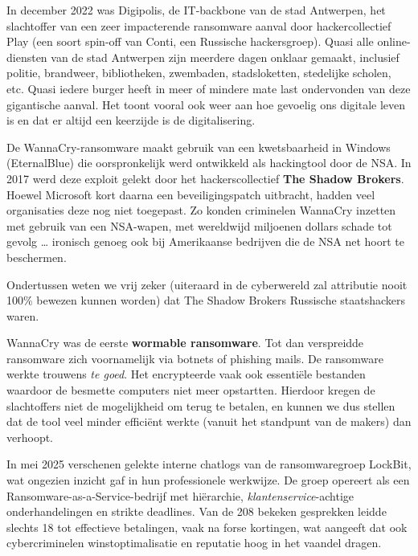 \documentclass[
  10pt,
  dutch,
  paper=a4,
  ,captions=tableheading
]{scrbook}
\begin{document}
\begin{noteblock}
In december 2022 was Digipolis, de IT-backbone van de stad Antwerpen,
het slachtoffer van een zeer impacterende ransomware aanval door
hackercollectief Play (een soort spin-off van Conti, een Russische
hackersgroep). Quasi alle online-diensten van de stad Antwerpen zijn
meerdere dagen onklaar gemaakt, inclusief politie, brandweer,
bibliotheken, zwembaden, stadsloketten, stedelijke scholen, etc. Quasi
iedere burger heeft in meer of mindere mate last ondervonden van deze
gigantische aanval. Het toont vooral ook weer aan hoe gevoelig ons
digitale leven is en dat er altijd een keerzijde is de digitalisering.
\end{noteblock}

De WannaCry-ransomware maakt gebruik van een kwetsbaarheid in Windows
(EternalBlue) die oorspronkelijk werd ontwikkeld als hackingtool door de
NSA. In 2017 werd deze exploit gelekt door het hackerscollectief
\textbf{The Shadow Brokers}. Hoewel Microsoft kort daarna een
beveiligingspatch uitbracht, hadden veel organisaties deze nog niet
toegepast. Zo konden criminelen WannaCry inzetten met gebruik van een
NSA-wapen, met wereldwijd miljoenen dollars schade tot gevolg \ldots{}
ironisch genoeg ook bij Amerikaanse bedrijven die de NSA net hoort te
beschermen.

\begin{noteblock}
Ondertussen weten we vrij zeker (uiteraard in de cyberwereld zal
attributie nooit 100\% bewezen kunnen worden) dat The Shadow Brokers
Russische staatshackers waren.
\end{noteblock}

\begin{noteblock}
WannaCry was de eerste \textbf{wormable ransomware}. Tot dan verspreidde
ransomware zich voornamelijk via botnets of phishing mails. De
ransomware werkte trouwens \emph{te goed}. Het encrypteerde vaak ook
essentiële bestanden waardoor de besmette computers niet meer
opstartten. Hierdoor kregen de slachtoffers niet de mogelijkheid om
terug te betalen, en kunnen we dus stellen dat de tool veel minder
efficiënt werkte (vanuit het standpunt van de makers) dan verhoopt.
\end{noteblock}

In mei 2025 verschenen gelekte interne chatlogs van de ransomwaregroep
LockBit, wat ongezien inzicht gaf in hun professionele werkwijze. De
groep opereert als een Ransomware-as-a-Service-bedrijf met hiërarchie,
\emph{klantenservice}-achtige onderhandelingen en strikte deadlines. Van
de 208 bekeken gesprekken leidde slechts 18 tot effectieve betalingen,
vaak na forse kortingen, wat aangeeft dat ook cybercriminelen
winstoptimalisatie en reputatie hoog in het vaandel dragen.
\end{document}

